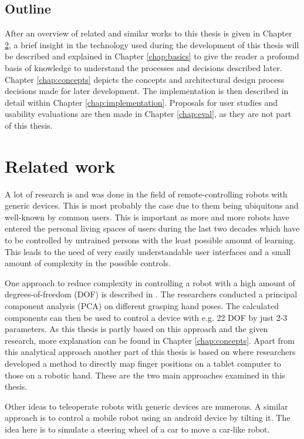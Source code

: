 \section{Outline}
After an overview of related and similar works to this thesis is given in Chapter \ref{chap:related}, a brief insight in the technology used during the development of this thesis will be described and explained in Chapter \ref{chap:basics} to give the reader a profound basis of knowledge to understand the processes and decisions described later. Chapter \ref{chap:concepts} depicts the concepts and architectural design process decisions made for later development. The implementation is then described in detail within Chapter \ref{chap:implementation}. Proposals for user studies and usability evaluations are then made in Chapter \ref{chap:eval}, as they are not part of this thesis.

\chapter{Related work}
\label{chap:related}
A lot of research is and was done in the field of remote-controlling robots with generic devices. This is most probably the case due to them being ubiquitous and well-known by common users. This is important as more and more robots have entered the personal living spaces of users during the last two decades\cite{Forlizzi2006} which have to be controlled by untrained persons with the least possible amount of learning. This leads to the need of very easily understandable user interfaces and a small amount of complexity in the possible controls. 

One approach to reduce complexity in controlling a robot with a high amount of degrees-of-freedom (DOF) is described in \cite{Bernardino2013}. The researchers conducted a principal component analysis (PCA) on different grasping hand poses. The calculated components can then be used to control a device with e.g. 22 DOF by just 2-3 parameters. As this thesis is partly based on this approach and the given research, more explanation can be found in Chapter \ref{chap:concepts}. Apart from this analytical approach another part of this thesis is based on \cite{conf:humanoids:TohHLBZP12} where researchers developed a method to directly map finger positions on a tablet computer to those on a robotic hand. These are the two main approaches examined in this thesis.

Other ideas to teleoperate robots with generic devices are numerous. A similar approach is to control a mobile robot using an android device by tilting it\cite{Akupati2017}. The idea here is to simulate a steering wheel of a car to move a car-like robot. 

